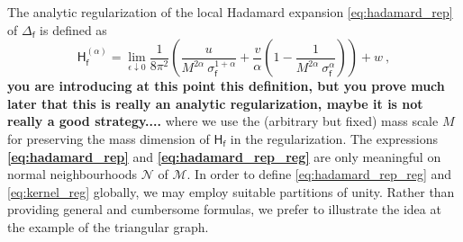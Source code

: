 \documentclass[11pt]{book}
\newcommand{\com}[1]{{\color{red}\bf #1}}
\newcommand{\Mcal}{\mathcal{M}}
\newcommand{\Ncal}{\mathcal{N}}
\newcommand{\Hsf}{\mathsf{H}}
\newcommand{\fsf}{\mathsf{f}}
\theoremstyle{break}
\begin{document}
The analytic regularization of the local Hadamard expansion \ref{eq:hadamard_rep} of $\Delta_\fsf$ is defined as 
%
\begin{equation}
\Hsf^{(\alpha)}_\fsf = \lim_{\epsilon \downarrow 0} \frac{1}{8\pi^2} \left( \frac{u}{M^{2\alpha} \ \sigma_\fsf^{1+\alpha}} + \frac{v}{\alpha} \left( 1 - \frac{1}{ M^{2\alpha} \ \sigma_\fsf^{\alpha} } \right) \right) + w \ ,
\label{eq:hadamard_rep_reg}
\end{equation}
%
\com{you are introducing at this point this definition, but you prove much later that this is really an analytic regularization, maybe it is not really a good strategy....}
where we use the (arbitrary but fixed) mass scale $M$ for preserving the mass dimension of $\Hsf_\fsf$ in the regularization. The expressions \com{\eqref{eq:hadamard_rep}} and \com{\eqref{eq:hadamard_rep_reg}} are only meaningful on normal neighbourhoods $\Ncal$ of $\Mcal$. In order to define \ref{eq:hadamard_rep_reg} and \ref{eq:kernel_reg} globally, we may employ suitable partitions of unity. Rather than providing general and cumbersome formulas, we prefer to illustrate the idea at the example of the triangular graph.


\begin{figure}
\begin{center}
\end{center}
\end{figure}
\end{document}
